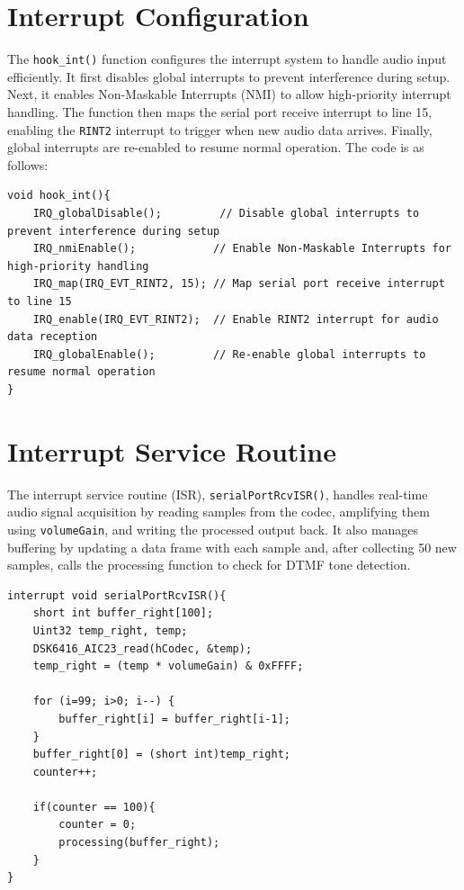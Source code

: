 \documentclass{article}
\begin{document}
\section*{Interrupt Configuration}
The \texttt{hook\_int()} function configures the interrupt system to handle audio input efficiently. It first disables global interrupts to prevent interference during setup. Next, it enables Non-Maskable Interrupts (NMI) to allow high-priority interrupt handling. The function then maps the serial port receive interrupt to line 15, enabling the \texttt{RINT2} interrupt to trigger when new audio data arrives. Finally, global interrupts are re-enabled to resume normal operation. The code is as follows:

\begin{lstlisting}
void hook_int(){
    IRQ_globalDisable();         // Disable global interrupts to prevent interference during setup
    IRQ_nmiEnable();            // Enable Non-Maskable Interrupts for high-priority handling
    IRQ_map(IRQ_EVT_RINT2, 15); // Map serial port receive interrupt to line 15
    IRQ_enable(IRQ_EVT_RINT2);  // Enable RINT2 interrupt for audio data reception
    IRQ_globalEnable();         // Re-enable global interrupts to resume normal operation
}
\end{lstlisting}

\section*{Interrupt Service Routine}
The interrupt service routine (ISR), \texttt{serialPortRcvISR()}, handles real-time audio signal acquisition by reading samples from the codec, amplifying them using \texttt{volumeGain}, and writing the processed output back. It also manages buffering by updating a data frame with each sample and, after collecting 50 new samples, calls the processing function to check for DTMF tone detection.

\begin{lstlisting}
interrupt void serialPortRcvISR(){
    short int buffer_right[100];
    Uint32 temp_right, temp;
    DSK6416_AIC23_read(hCodec, &temp);
    temp_right = (temp * volumeGain) & 0xFFFF;

    for (i=99; i>0; i--) {
        buffer_right[i] = buffer_right[i-1];
    }
    buffer_right[0] = (short int)temp_right;
    counter++;

    if(counter == 100){
        counter = 0;
        processing(buffer_right);
    }
}
\end{lstlisting}
\end{document}
